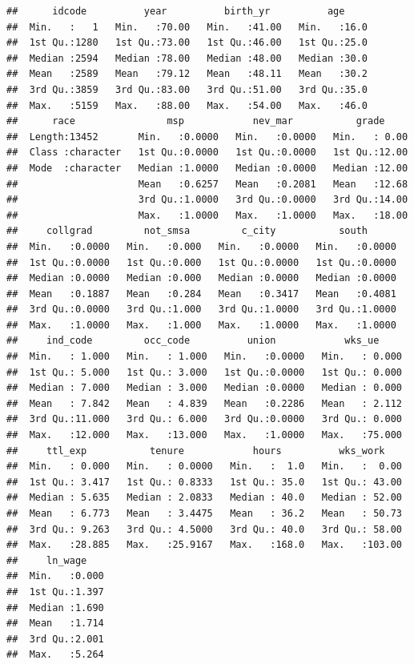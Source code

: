 \documentclass[
]{article}
\begin{document}
\begin{verbatim}
##      idcode          year          birth_yr          age      
##  Min.   :   1   Min.   :70.00   Min.   :41.00   Min.   :16.0  
##  1st Qu.:1280   1st Qu.:73.00   1st Qu.:46.00   1st Qu.:25.0  
##  Median :2594   Median :78.00   Median :48.00   Median :30.0  
##  Mean   :2589   Mean   :79.12   Mean   :48.11   Mean   :30.2  
##  3rd Qu.:3859   3rd Qu.:83.00   3rd Qu.:51.00   3rd Qu.:35.0  
##  Max.   :5159   Max.   :88.00   Max.   :54.00   Max.   :46.0  
##      race                msp            nev_mar           grade      
##  Length:13452       Min.   :0.0000   Min.   :0.0000   Min.   : 0.00  
##  Class :character   1st Qu.:0.0000   1st Qu.:0.0000   1st Qu.:12.00  
##  Mode  :character   Median :1.0000   Median :0.0000   Median :12.00  
##                     Mean   :0.6257   Mean   :0.2081   Mean   :12.68  
##                     3rd Qu.:1.0000   3rd Qu.:0.0000   3rd Qu.:14.00  
##                     Max.   :1.0000   Max.   :1.0000   Max.   :18.00  
##     collgrad         not_smsa         c_city           south       
##  Min.   :0.0000   Min.   :0.000   Min.   :0.0000   Min.   :0.0000  
##  1st Qu.:0.0000   1st Qu.:0.000   1st Qu.:0.0000   1st Qu.:0.0000  
##  Median :0.0000   Median :0.000   Median :0.0000   Median :0.0000  
##  Mean   :0.1887   Mean   :0.284   Mean   :0.3417   Mean   :0.4081  
##  3rd Qu.:0.0000   3rd Qu.:1.000   3rd Qu.:1.0000   3rd Qu.:1.0000  
##  Max.   :1.0000   Max.   :1.000   Max.   :1.0000   Max.   :1.0000  
##     ind_code         occ_code          union            wks_ue      
##  Min.   : 1.000   Min.   : 1.000   Min.   :0.0000   Min.   : 0.000  
##  1st Qu.: 5.000   1st Qu.: 3.000   1st Qu.:0.0000   1st Qu.: 0.000  
##  Median : 7.000   Median : 3.000   Median :0.0000   Median : 0.000  
##  Mean   : 7.842   Mean   : 4.839   Mean   :0.2286   Mean   : 2.112  
##  3rd Qu.:11.000   3rd Qu.: 6.000   3rd Qu.:0.0000   3rd Qu.: 0.000  
##  Max.   :12.000   Max.   :13.000   Max.   :1.0000   Max.   :75.000  
##     ttl_exp           tenure            hours          wks_work     
##  Min.   : 0.000   Min.   : 0.0000   Min.   :  1.0   Min.   :  0.00  
##  1st Qu.: 3.417   1st Qu.: 0.8333   1st Qu.: 35.0   1st Qu.: 43.00  
##  Median : 5.635   Median : 2.0833   Median : 40.0   Median : 52.00  
##  Mean   : 6.773   Mean   : 3.4475   Mean   : 36.2   Mean   : 50.73  
##  3rd Qu.: 9.263   3rd Qu.: 4.5000   3rd Qu.: 40.0   3rd Qu.: 58.00  
##  Max.   :28.885   Max.   :25.9167   Max.   :168.0   Max.   :103.00  
##     ln_wage     
##  Min.   :0.000  
##  1st Qu.:1.397  
##  Median :1.690  
##  Mean   :1.714  
##  3rd Qu.:2.001  
##  Max.   :5.264
\end{verbatim}
\end{document}
